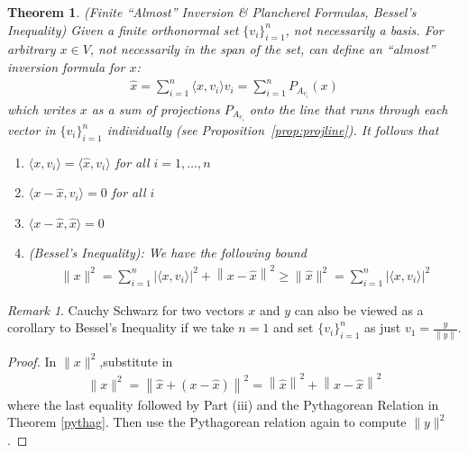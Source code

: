 \documentclass[12pt]{book}
\numberwithin{equation}{section} %
\theoremstyle{plain}
\newtheorem{thm}{Theorem}[section]
\theoremstyle{definition}
\theoremstyle{remark}
\newtheorem*{rmk}{Remark}
\begin{document}
\begin{thm}
\label{thm:almostinversion}
\emph{(Finite ``Almost'' Inversion \& Plancherel Formulas, Bessel's Inequality)}
Given a finite orthonormal set $\{v_i\}_{i=1}^n$, not necessarily a
basis.
For arbitrary $x\in V$, not necessarily in the span of
the set, can define an ``almost'' inversion formula for $x$:
\begin{align*}
  \hat{x}
  = \sum_{i=1}^n \langle x,v_i\rangle v_i
  = \sum_{i=1}^n P_{A_{v_i}}(x)
\end{align*}
which writes $x$ as a sum of projections $P_{A_{v_i}}$ onto the line
that runs through each vector in $\{v_i\}_{i=1}^n$ individually (see
Proposition~\ref{prop:projline}).
It follows that
\begin{enumerate}[label=\emph{(\roman*)}]
  \item
    $\langle x,v_i\rangle =\langle \hat{x},v_i\rangle$
    for all $i=1,\ldots,n$
  \item $\langle x-\hat{x},v_i\rangle=0$ for all $i$
  \item $\langle x-\hat{x},\hat{x}\rangle=0$
  \item
    \emph{(Bessel's Inequality):}
    We have the following bound
    \begin{align*}
      \lVert x\rVert^2 =
      \sum_{i=1}^n \bigl\lvert\langle x,v_i\rangle\bigr\rvert^2
      + \left\lVert x -  \hat{x} \right\rVert^2
      \geq
      \lVert \hat{x}\rVert^2
      =
      \sum_{i=1}^n \bigl\lvert\langle x,v_i\rangle\bigr\rvert^2
    \end{align*}
\end{enumerate}
\end{thm}
\begin{rmk}
Cauchy Schwarz for two vectors $x$ and $y$ can also be viewed as a
corollary to Bessel's Inequality if we take $n=1$ and
set $\{v_i\}_{i=1}^n$ as just $v_1=\frac{y}{\lVert y\rVert}$.
\end{rmk}
\begin{proof}
In $\lVert x\rVert^2$,substitute in
\begin{align*}
  \lVert x\rVert^2 =
  \left\lVert
  \hat{x} + \left( x - \hat{x}\right)
  \right\rVert^2
  =
  \left\lVert
  \hat{x}
  \right\rVert^2
  +
  \left\lVert
  x - \hat{x}
  \right\rVert^2
\end{align*}
where the last equality followed by Part (iii) and the Pythagorean
Relation in Theorem \ref{pythag}.
Then use the Pythagorean relation again to compute $\lVert y\rVert^2$.
\end{proof}
\end{document}
